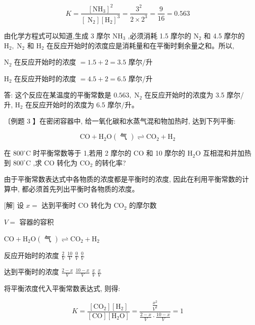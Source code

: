 \documentclass[10pt]{article}
\begin{document}
\[
K = \frac{{\left\lbrack {\mathrm{{NH}}}_{3}\right\rbrack }^{2}}{\left\lbrack {\mathrm{\;N}}_{2}\right\rbrack {\left\lbrack {\mathrm{H}}_{2}\right\rbrack }^{3}} = \frac{{3}^{2}}{2 \times {2}^{3}} = \frac{9}{16} = {0.563}
\]

由化学方程式可以知道,生成 3 摩尔 \({\mathrm{{NH}}}_{3}\) ,必须消耗 1.5 摩尔的 \({\mathrm{N}}_{2}\) 和 4.5 摩尔的 \({\mathrm{H}}_{2},{\mathrm{\;N}}_{2}\) 和 \({\mathrm{H}}_{2}\) 在反应开始时的浓度应是消耗量和在平衡时剩余量之和。所以,

\({\mathrm{N}}_{2}\) 在反应开始时的浓度 \(= {1.5} + 2 = {3.5}\) 摩尔/升

\({\mathrm{H}}_{2}\) 在反应开始时的浓度 \(= {4.5} + 2 = {6.5}\) 摩尔/升

答: 这个反应在某温度的平衡常数是 \({0.563},{\mathrm{\;N}}_{2}\) 在反应开始时的浓度为 3.5 摩尔/升, \({\mathrm{H}}_{2}\) 在反应开始时的浓度为 6.5 摩尔/升。

〔例题 3 】在密闭容器中, 给一氧化碳和水蒸气混和物加热时, 达到下列平衡:

\[
\mathrm{{CO}} + {\mathrm{H}}_{2}\mathrm{O}\left( \text{ 气 }\right) \rightleftharpoons {\mathrm{{CO}}}_{2} + {\mathrm{H}}_{2}
\]

在 \({800}^{ \circ }\mathrm{C}\) 时平衡常数等于 1,若用 2 摩尔的 \(\mathrm{{CO}}\) 和 10 摩尔的 \({\mathrm{H}}_{2}\mathrm{O}\) 互相混和并加热到 \({800}^{ \circ }\mathrm{C}\) ,求 \(\mathrm{{CO}}\) 转化为 \({\mathrm{{CO}}}_{2}\) 的转化率?

由于平衡常数表达式中各物质的浓度都是平衡时的浓度, 因此在利用平衡常数的计算中, 都必须首先列出平衡时各物质的浓度。

[解] 设 \(x =\) 达到平衡时 \(\mathrm{{CO}}\) 转化为 \({\mathrm{{CO}}}_{2}\) 的摩尔数

\(V =\) 容器的容积

\(\mathrm{{CO}} + {\mathrm{H}}_{2}\mathrm{O}\left( \text{ 气 }\right) \rightleftharpoons {\mathrm{{CO}}}_{2} + {\mathrm{H}}_{2}\)

反应开始时的浓度 \(\frac{2}{V}\;\frac{10}{V}\;\frac{0}{V}\;\frac{0}{V}\)

达到平衡时的浓度 \(\frac{2 - x}{V}\;\frac{{10} - x}{V}\;\frac{x}{V}\;\frac{x}{V}\)

将平衡浓度代入平衡常数表达式, 则得:

\[
K = \frac{\left\lbrack {\mathrm{{CO}}}_{2}\right\rbrack \left\lbrack {\mathrm{H}}_{2}\right\rbrack }{\left\lbrack \mathrm{{CO}}\right\rbrack \left\lbrack {{\mathrm{H}}_{2}\mathrm{O}}\right\rbrack } = \frac{\frac{{x}^{2}}{{V}^{2}}}{\frac{2 - x}{V} \cdot \frac{{10} - x}{V}} = 1
\]
\end{document}
